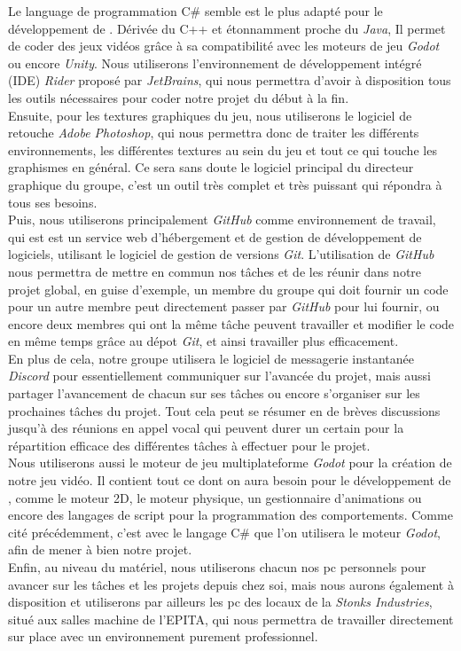 Le language de programmation C\# semble est le plus adapté pour le développement de \textit{\gameName}. 
Dérivée du C++ et étonnamment proche du \textit{Java}, Il permet de coder des jeux vidéos grâce à sa compatibilité avec les moteurs de jeu \textit{Godot} ou encore \textit{Unity}.
Nous utiliserons l’environnement de développement intégré (IDE) \textit{Rider} proposé par \textit{JetBrains}, qui  nous permettra d’avoir à disposition tous les outils nécessaires pour coder notre projet du début à la fin.
\\

Ensuite, pour les textures graphiques du jeu, nous utiliserons le logiciel de retouche \textit{Adobe Photoshop}, qui nous permettra donc de traiter les différents environnements, les différentes textures au sein du jeu et tout ce qui touche les graphismes en général.
Ce sera sans doute le logiciel principal du directeur graphique du groupe, c'est un outil très complet et très puissant qui répondra à tous ses besoins.
\\

Puis, nous utiliserons principalement \textit{GitHub} comme environnement de travail, qui est est un service web d’hébergement et de gestion de développement de logiciels, utilisant le logiciel de gestion de versions \textit{Git}. 
L’utilisation de \textit{GitHub} nous permettra de mettre en commun nos tâches et de les réunir dans notre projet global, en guise d’exemple, un membre du groupe qui doit fournir un code pour un autre membre peut directement passer par \textit{GitHub} pour lui fournir, ou encore deux membres qui ont la même tâche peuvent travailler et modifier le code en même temps grâce au dépot \textit{Git}, et ainsi travailler plus efficacement.
\\

En plus de cela, notre groupe utilisera le logiciel de messagerie instantanée \textit{Discord} pour essentiellement communiquer sur l’avancée du projet, mais aussi partager l’avancement de chacun sur ses tâches ou encore s’organiser sur les prochaines tâches du projet. Tout cela peut se résumer en de brèves discussions jusqu’à des réunions en appel vocal qui peuvent durer un certain pour la répartition efficace des différentes tâches à effectuer pour le projet.
\\

Nous utiliserons aussi le moteur de jeu multiplateforme \textit{Godot} pour la création de notre jeu vidéo.
Il contient tout ce dont on aura besoin pour le développement de \textit{\gameName}, comme le moteur 2D, le moteur physique, un gestionnaire d’animations ou encore des langages de script pour la programmation des comportements. 
Comme cité précédemment, c’est avec le langage C\# que l’on utilisera le moteur \textit{Godot}, afin de mener à bien notre projet.
\\

Enfin, au niveau du matériel, nous utiliserons chacun nos pc personnels pour avancer sur les tâches et les projets depuis chez soi, mais nous aurons également à disposition et utiliserons par ailleurs les pc des locaux de la \textit{Stonks Industries}, situé aux salles machine de l’EPITA, qui nous permettra de travailler directement sur place avec un environnement purement professionnel.
\\
